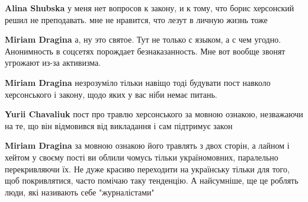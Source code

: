\begin{itemize}
\begin{itemize}
 
\textbf{Alina Shubska} у меня нет вопросов к закону, и к тому, что борис херсонский решил не преподавать. мне не нравится, что лезут в личную жизнь тоже

 

\textbf{Miriam Dragina} а, ну это святое. Тут не только с языком, а с чем угодно. Анонимность в соцсетях порождает безнаказанность. Мне вот вообще звонят угрожают из-за активизма.

 
\textbf{Miriam Dragina} незрозуміло тільки навіщо тоді будувати пост навколо херсонського і закону, щодо яких у вас ніби немає питань.

 
\textbf{Yurii Chavaliuk} пост про травлю херсонського за мовною ознакою, незважаючи на те, що він відмовився від викладання і сам підтримує закон

 
\textbf{Miriam Dragina} за мовною ознакою його травлять з двох сторін, а лайном і хейтом у своєму пості ви облили чомусь тільки україномовних, паралельно перекривляючи їх. Не дуже красиво переходити на українську тільки для того, щоб покривлятися, часто помічаю таку тенденцію. А найсумніше, ще це роблять люди, які називають себе "журналістами"

 

\end{itemize}
\end{itemize}
